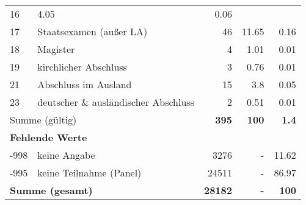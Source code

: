 \begin{longtable}{lXrrr}
       \num{16} &
       \num[round-mode=places,round-precision=2]{4.05} &
         \num[round-mode=places,round-precision=2]{0.06} \\

     17 &
     \multicolumn{1}{X}{ Staatsexamen (außer LA)   } &


       \num{46} &
       \num[round-mode=places,round-precision=2]{11.65} &
         \num[round-mode=places,round-precision=2]{0.16} \\

     18 &
     \multicolumn{1}{X}{ Magister   } &


       \num{4} &
       \num[round-mode=places,round-precision=2]{1.01} &
         \num[round-mode=places,round-precision=2]{0.01} \\

     19 &
     \multicolumn{1}{X}{ kirchlicher Abschluss   } &


       \num{3} &
       \num[round-mode=places,round-precision=2]{0.76} &
         \num[round-mode=places,round-precision=2]{0.01} \\

     21 &
     \multicolumn{1}{X}{ Abschluss im Ausland   } &


       \num{15} &
       \num[round-mode=places,round-precision=2]{3.8} &
         \num[round-mode=places,round-precision=2]{0.05} \\

     23 &
     \multicolumn{1}{X}{ deutscher \& ausländischer Abschluss   } &


       \num{2} &
       \num[round-mode=places,round-precision=2]{0.51} &
         \num[round-mode=places,round-precision=2]{0.01} \\
     \midrule
     \multicolumn{2}{l}{Summe (gültig)} &
       \textbf{\num{395}} &
     \textbf{100} &
       \textbf{\num[round-mode=places,round-precision=2]{1.4}} \\
     \multicolumn{5}{l}{\textbf{Fehlende Werte}}\\
       -998 &
       keine Angabe &
         \num{3276} &
        - &
         \num[round-mode=places,round-precision=2]{11.62} \\
       -995 &
       keine Teilnahme (Panel) &
         \num{24511} &
        - &
         \num[round-mode=places,round-precision=2]{86.97} \\
     \midrule
     \multicolumn{2}{l}{\textbf{Summe (gesamt)}} &
          \textbf{\num{28182}} &
        \textbf{-} &
        \textbf{100} \\
     \bottomrule
     \end{longtable}
     
